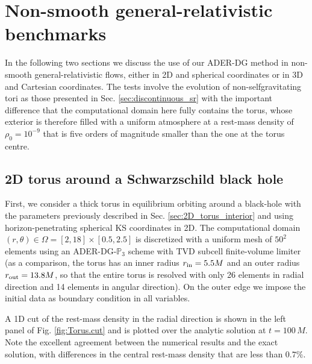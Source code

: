 \section{Non-smooth general-relativistic benchmarks}
\label{sec:discontinuous_gr}

In the following two sections we discuss the use of our ADER-DG method in
non-smooth general-relativistic flows, either in 2D and spherical
coordinates or in 3D and Cartesian coordinates. The tests involve the
evolution of non-selfgravitating tori as those presented in
Sec. \ref{sec:discontinuous_sr} with the important difference that the
computational domain here fully contains the torus, whose exterior is
therefore filled with a uniform atmosphere at a rest-mass density of
$\rho_0=10^{-9}$ that is five orders of magnitude smaller than the one at
the torus centre.

\subsection{2D torus around a Schwarzschild black hole}
\label{sec:full_torus}

First, we consider a thick torus in equilibrium orbiting around a
black-hole with the parameters previously described in
Sec. \ref{sec:2D_torus_interior} and using horizon-penetrating spherical
KS coordinates in 2D. The computational domain $(r,\theta) \in \Omega =
[2,18] \times[0.5,2.5]$ is discretized with a uniform mesh of $50^2$ 
elements using an ADER-DG-$\mathbb{P}_3$ scheme with TVD subcell 
finite-volume limiter (as a comparison, the torus has an inner radius 
$r_{\rm in} = 5.5M$ and an outer radius $r_{\rm out}= 13.8M$, so that 
the entire torus is resolved with only 26 elements in radial direction
and 14 elements in angular direction). 
On the outer edge we impose the initial data as boundary condition in all 
variables. 

A 1D cut of the rest-mass density in the radial direction is shown in the
left panel of Fig. \ref{fig:Torus.cut} and is plotted over the analytic
solution at $t=100\,M$.  Note the excellent agreement between the
numerical results and the exact solution, with differences in the central
rest-mass density that are less than $0.7\%$.

